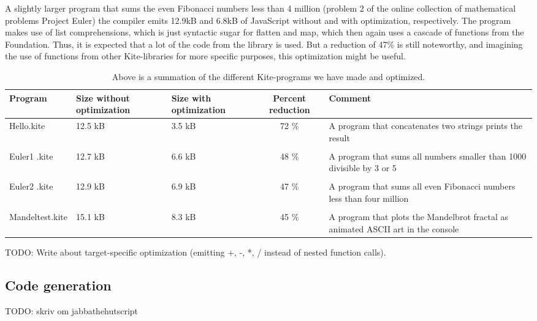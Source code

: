 A slightly larger program that sums the even Fibonacci numbers less than 4 million (problem 2 of the online collection of mathematical problems Project Euler\cite{euler}) the compiler emits 12.9kB and 6.8kB of JavaScript without and with optimization, respectively. The program makes use of list comprehensions, which is just syntactic sugar for flatten and map, which then again uses a cascade of functions from the Foundation. Thus, it is expected that a lot of the code from the library is used. But a reduction of 47\% is still noteworthy, and imagining the use of functions from other Kite-libraries for more specific purposes, this optimization might be useful.

\begin{table}[h]
  \centering
  \begin{tabulary}{0.9\textwidth}{|L| L |L| C | L | }
    \hline
    Program & Size without optimization & Size with optimization & Percent reduction & Comment \\
    \hline
    Hello.kite       & 12.5 kB & 3.5 kB & 72 \% & A program that concatenates two strings prints the result \\
    & & & & \\
    Euler1 .kite       & 12.7 kB & 6.6 kB & 48 \% & A program that sums all numbers smaller than 1000 divisible by 3 or 5 \\
    & & & & \\
    Euler2 .kite       & 12.9 kB & 6.9 kB & 47 \% & A program that sums all even Fibonacci numbers less than four million \\
    & & & & \\
    Mandeltest.kite       & 15.1 kB & 8.3 kB & 45 \% & A program that plots the Mandelbrot fractal as animated ASCII art in the console\\
    \hline
  \end{tabulary}
  \caption{Above is a summation of the different Kite-programs we have made and optimized.}
\end{table}

TODO: Write about target-specific optimization (emitting +, -, *, / instead of nested function calls).


\subsection{Code generation}
TODO: skriv om jabbathehutscript
